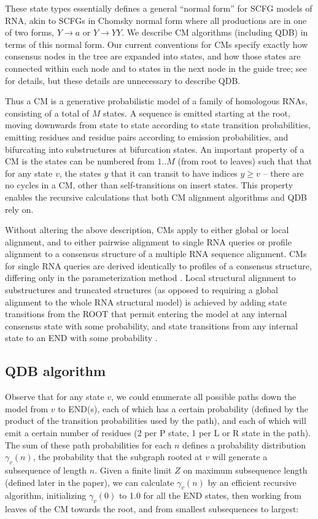 \documentclass[11pt]{article}
\begin{document}
These state types essentially defines a general ``normal form'' for
SCFG models of RNA, akin to SCFGs in Chomsky normal form where all
productions are in one of two forms, $Y \rightarrow a$ or $Y
\rightarrow YY$. We describe CM algorithms (including QDB) in terms of
this normal form. Our current conventions for CMs specify exactly how
consensus nodes in the tree are expanded into states, and how those
states are connected within each node and to states in the next node
in the guide tree; see \cite{Eddy02b, infguide03} for details, but
these details are unnecessary to describe QDB.

Thus a CM is a generative probabilistic model of a family of
homologous RNAs, consisting of a total of $M$ states. A sequence is
emitted starting at the root, moving downwards from state to state
according to state transition probabilities, emitting residues and
residue pairs according to emission probabilities, and bifurcating
into substructures at bifurcation states. An important property of a
CM is the states can be numbered from $1..M$ (from root to leaves)
such that that for any state $v$, the states $y$ that it can transit
to have indices $y \geq v$ -- there are no cycles in a CM, other than
self-transitions on insert states.  This property enables the
recursive calculations that both CM alignment algorithms and QDB rely
on.

Without altering the above description, CMs apply to either global or
local alignment, and to either pairwise alignment to single RNA
queries or profile alignment to a consensus structure of a multiple
RNA sequence alignment. CMs for single RNA queries are derived
identically to profiles of a consensus structure, differing only in
the parameterization method \citep{KleinXXX}. Local structural
alignment to substructures and truncated structures (as opposed to
requiring a global alignment to the whole RNA structural model) is
achieved by adding state transitions from the ROOT that permit
entering the model at any internal consensus state with some
probability, and state transitions from any internal state to an END
with some probability \citep{KleinEddy03}.

\subsection{QDB algorithm}

Observe that for any state $v$, we could enumerate all possible paths
down the model from $v$ to END(s), each of which has a certain
probability (defined by the product of the transition probabilities
used by the path), and each of which will emit a certain number of
residues (2 per P state, 1 per L or R state in the path). The sum of
these path probabilities for each $n$ defines a probability
distribution $\gamma_v(n)$, the probability that the subgraph rooted
at $v$ will generate a subsequence of length $n$.  Given a finite
limit $Z$ on maximum subsequence length (defined later in the paper),
we can calculate $\gamma_v(n)$ by an efficient recursive algorithm,
initializing $\gamma_{v}(0)$ to 1.0 for all the END states, then
working from leaves of the CM towards the root, and from smallest
subsequences to largest:
\end{document}
